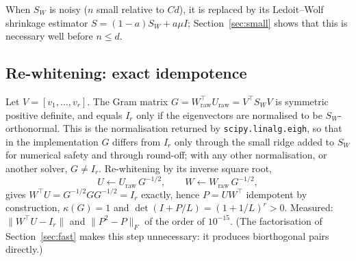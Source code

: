 \documentclass[11pt,a4paper]{article}
\theoremstyle{plain}
\theoremstyle{definition}
\theoremstyle{remark}
\newcommand{\T}{\top}
\begin{document}
When $S_W$ is noisy ($n$ small relative to $Cd$), it is replaced by its
Ledoit--Wolf shrinkage estimator $S=(1-a)S_W+a\mu I$; Section~\ref{sec:small}
shows that this is necessary well before $n\le d$.

\subsection{Re-whitening: exact idempotence}
Let $V=[v_1,\dots,v_r]$. The Gram matrix
$G=W_{\mathrm{raw}}^\T U_{\mathrm{raw}}=V^\T S_WV$ is symmetric positive
definite, and equals $I_r$ only if the eigenvectors are normalised to be
$S_W$-orthonormal. This is the normalisation returned by
\texttt{scipy.linalg.eigh}, so that in the implementation $G$ differs from
$I_r$ only through the small ridge added to $S_W$ for numerical safety and
through round-off; with any other normalisation, or another solver, $G\ne I_r$.
Re-whitening by its inverse square root,
\begin{equation}
  U\leftarrow U_{\mathrm{raw}}\,G^{-1/2},\qquad W\leftarrow W_{\mathrm{raw}}\,G^{-1/2},
  \label{eq:rewhiten}
\end{equation}
gives $W^\T U=G^{-1/2}GG^{-1/2}=I_r$ exactly, hence $P=UW^\T$ idempotent by
construction, $\kappa(G)=1$ and $\det(I+P/L)=(1+1/L)^r>0$. Measured:
$\|W^\T U-I_r\|$ and $\|P^2-P\|_F$ of the order of $10^{-15}$. (The
factorisation of Section~\ref{sec:fast} makes this step unnecessary: it
produces biorthogonal pairs directly.)
\end{document}
